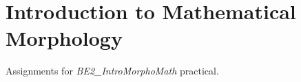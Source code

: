 \section{Introduction to Mathematical Morphology}
\label{sec:introduction_to_mathematical_morphology}

Assignments for \textit{BE2\_IntroMorphoMath} practical.